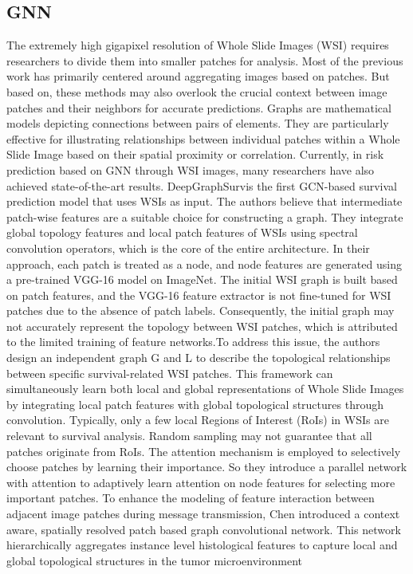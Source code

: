 \documentclass[journal,twoside,web]{ieeecolor}
\begin{document}
\subsection{GNN}
The extremely high gigapixel resolution of Whole Slide Images (WSI) requires researchers to divide them into smaller patches for analysis. Most of the previous work has primarily centered around aggregating images based on patches. But based on\cite{levy2020topological}, these methods may also overlook the crucial context between image patches and their neighbors for accurate predictions. Graphs are mathematical models depicting connections between pairs of elements. They are particularly effective for illustrating relationships between individual patches within a Whole Slide Image based on their spatial proximity or correlation. Currently, in risk prediction based on GNN through WSI images, many researchers have also achieved state-of-the-art results.
DeepGraphSurv\cite{li2018graph}is the first GCN-based survival prediction model that uses WSIs as input. The authors believe that intermediate patch-wise features are a suitable choice for constructing a graph. They integrate global topology features and local patch features of WSIs using spectral convolution operators, which is the core of the entire architecture. In their approach, each patch is treated as a node, and node features are generated using a pre-trained VGG-16 model on ImageNet. The initial WSI graph is built based on patch features, and the VGG-16 feature extractor is not fine-tuned for WSI patches due to the absence of patch labels. Consequently, the initial graph may not accurately represent the topology between WSI patches, which is attributed to the limited training of feature networks.To address this issue, the authors design an independent graph G and  L to describe the topological relationships between specific survival-related WSI patches. This framework can simultaneously learn both local and global representations of Whole Slide Images by integrating local patch features with global topological structures through convolution. Typically, only a few local Regions of Interest (RoIs) in WSIs are relevant to survival analysis. Random sampling may not guarantee that all patches originate from RoIs. The attention mechanism is employed to selectively choose patches by learning their importance. So they introduce a parallel network with attention to adaptively learn attention on node features for selecting more important patches.
To enhance the modeling of feature interaction between adjacent image patches during message transmission, Chen \cite{chen2021whole} introduced a context aware, spatially resolved patch based graph convolutional network. This network hierarchically aggregates instance level histological features to capture local and global topological structures in the tumor microenvironment
\end{document}
